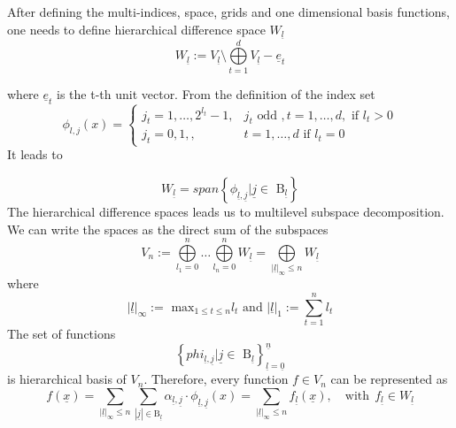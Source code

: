 After defining the multi-indices, space, grids and one dimensional basis functions, one needs to define hierarchical difference space $W_{\underline{l}}$
\begin{equation}
     W_{\underline{l}} := V_{\underline{l}} \setminus \bigoplus\limits_{t=1}^{d} V_{\underline{l}} - \underline{e}_{t}
\end{equation}

where $\underline{e}_{t}$ is the t-th unit vector. From the definition of the index set
\begin{equation}
     \phi_{l,j} (x) =
     \begin{cases}
     j_{t} = 1,\dots,2^{l_{t}} -1, &  j_{t} \text{ odd }, t= 1,\dots,d, \text{ if } l_{t} > 0\\
     j_{t} = 0,1,, & t=1,\dots,d \text{ if } l_{t} = 0 
     \end{cases}
\end{equation}
It leads to 

\begin{equation}
     W_{\underline{l}} = span\left\{\phi_{\underline{l},\underline{j}} | \underline{j} \in \text{ B}_{\underline{l}}\right\}
\end{equation}
The hierarchical difference spaces leads us to multilevel subspace decomposition. We can write the spaces as the direct sum of the subspaces
\begin{equation}
     V_{n} := \bigoplus\limits_{l_{1} = 0}^n \dots \bigoplus\limits_{l_{n} = 0}^n W_{\underline{l}} = \bigoplus\limits_{\left|\underline{l} \right|_{\infty} \leq n} W_{\underline{l}}
     \label{eq9}
\end{equation}
where
\begin{equation}
     \left|\underline{l} \right|_{\infty} := \text{ max}_{1 \leq t \leq n} l_{t} \text{ and } \left|\underline{l} \right|_{1} := \sum\limits_{t=1}^{n} l_{t}
\end{equation}
The set of functions
\begin{equation}
     \left\{phi_{\underline{l},\underline{j}} | \underline{j} \in \text{ B}_{\underline{l}} \right\}_{\underline{l} = \underline{0}}^{\underline{n}}
\end{equation}
is hierarchical basis of $V_{n}$. Therefore, every function $f \in V_{n}$ can be represented as
\begin{equation}
	f(\underline{x}) = \sum_{|\underline{l}|_\infty\le n} \sum_{|\underline{j}| \in \text{B}_{\underline{l}}} \alpha_{\underline{l},\underline{j}} \cdot \phi_{\underline{l},\underline{j}} (x) = \sum_{|\underline{l}|_\infty\le n} f_{\underline{l}}(\underline{x}), \quad \text{with} \ \ f_{\underline{l}} \in W_{\underline{l}}
\end{equation}

